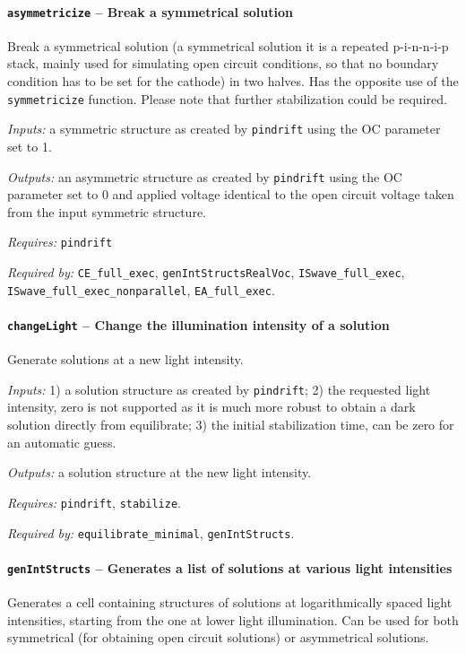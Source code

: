 		\paragraph{\texttt{asymmetricize} -- Break a symmetrical solution}\label{asymmetricize}
		Break a symmetrical solution (a symmetrical solution it is a repeated p-i-n-n-i-p stack, mainly used for simulating open circuit conditions, so that no boundary condition has to be set for the cathode) in two halves. Has the opposite use of the \texttt{symmetricize} function.
		Please note that further stabilization could be required.
		
		\textit{Inputs:} a symmetric structure as created by \texttt{pin\-drift} using the OC parameter set to 1.
		
		\textit{Outputs:} an asymmetric structure as created by \texttt{pin\-drift} using the OC
		     parameter set to 0 and applied voltage identical to the open circuit
		     voltage taken from the input symmetric structure.
		     
	\textit{Requires:} \texttt{pin\-drift}
	
	\textit{Required by:} \texttt{CE\_full\_exec}, \texttt{gen\-Int\-Structs\-Real\-Voc}, \texttt{IS\-wave\_full\_exec}, \texttt{IS\-wave\_full\_exec\_nonparallel}, \texttt{EA\_full\_exec}.

		\paragraph{\texttt{change\-Light} -- Change the illumination intensity of a solution}
		Generate solutions at a new light intensity.
		
		\textit{Inputs:} 1) a solution structure as created by \texttt{pin\-drift};
		2) the requested light intensity, zero is not supported as it is
		    much more robust to obtain a dark solution directly from equilibrate;
		3) the initial stabilization time, can be zero for an automatic
		     guess.
		     
		\textit{Outputs:} a solution structure at the new light intensity.
		
		\textit{Requires:} \texttt{pin\-drift}, \texttt{stabilize}.
		
			\textit{Required by:} \texttt{equilibrate\_minimal}, \texttt{gen\-Int\-Structs}.
			
		\paragraph{\texttt{gen\-Int\-Structs} -- Generates a list of solutions at various light intensities}\label{genIntStructs}
Generates a cell containing structures of solutions at logarithmically spaced light intensities, starting from the one at lower light illumination. Can be used for both symmetrical (for obtaining open circuit solutions) or asymmetrical solutions.

